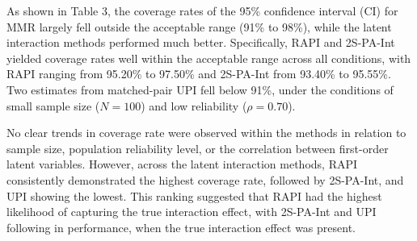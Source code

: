 \documentclass[
  man]{apa6}
\begin{document}
As shown in Table 3, the coverage rates of the 95\% confidence interval (CI) for MMR largely fell outside the acceptable range (91\% to 98\%), while the latent interaction methods performed much better. Specifically, RAPI and 2S-PA-Int yielded coverage rates well within the acceptable range across all conditions, with RAPI ranging from 95.20\% to 97.50\% and 2S-PA-Int from 93.40\% to 95.55\%. Two estimates from matched-pair UPI fell below 91\%, under the conditions of small sample size (\(\textit{N} = 100\)) and low reliability (\(\rho = 0.70\)).

No clear trends in coverage rate were observed within the methods in relation to sample size, population reliability level, or the correlation between first-order latent variables. However, across the latent interaction methods, RAPI consistently demonstrated the highest coverage rate, followed by 2S-PA-Int, and UPI showing the lowest. This ranking suggested that RAPI had the highest likelihood of capturing the true interaction effect, with 2S-PA-Int and UPI following in performance, when the true interaction effect was present.
\end{document}
